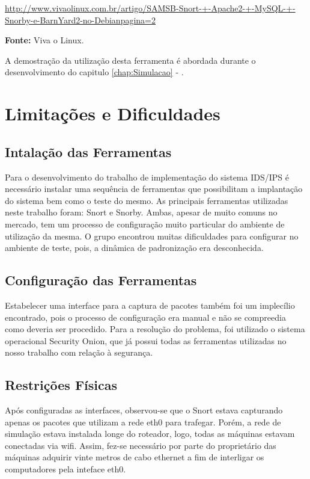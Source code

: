 \begin{itemize}
				\begin{framed}
					\href{http://www.vivaolinux.com.br/artigo/SAMSB-Snort-+-Apache2-+-MySQL-+-Snorby-e-BarnYard2-no-Debian?pagina=2}{http://www.vivaolinux.com.br/artigo/SAMSB-Snort-+-Apache2-+-MySQL-+-Snorby-e-BarnYard2-no-Debian\?pagina=2}
				\end{framed}

				\textbf{Fonte:} Viva o Linux.

				A demostração da utilização desta ferramenta é abordada durante o desenvolvimento do capitulo \ref{chap:Simulacao} - .

			\end{itemize}

	\section{Limitações e Dificuldades}
	\label{sec:Arquitetura_Limitacoes}

		\subsection{Intalação das Ferramentas}
			Para o desenvolvimento do trabalho de implementação do sistema IDS/IPS é
			necessário instalar uma sequência de ferramentas que possibilitam a implantação
			do sistema bem como o teste do mesmo. As principais ferramentas utilizadas
			neste trabalho foram: Snort e Snorby. Ambas, apesar de muito comuns no mercado,
			tem um processo de configuração muito particular do ambiente de utilização
			da mesma. O grupo encontrou muitas dificuldades para configurar no ambiente
			de teste, pois, a dinâmica de padronização era desconhecida.

		\subsection{Configuração das Ferramentas}
			Estabelecer uma interface para a captura de pacotes também foi um implecílio
			encontrado, pois o processo de configuração era manual e não se compreedia
			como deveria ser procedido. Para a resolução do problema, foi utilizado o
			sistema operacional Security Onion, que já possui todas as ferramentas
			utilizadas no nosso trabalho com relação à segurança.

		\subsection{Restrições Físicas}
			Após configuradas as interfaces, observou-se que o Snort estava capturando
			apenas os pacotes que utilizam a rede eth0 para trafegar. Porém, a rede de
			simulação estava instalada longe do roteador, logo, todas as máquinas estavam
			conectadas via wifi. Assim, fez-se necessário por parte do proprietário das
			máquinas adquirir vinte metros de cabo ethernet a fim de interligar os
			computadores pela inteface eth0.

